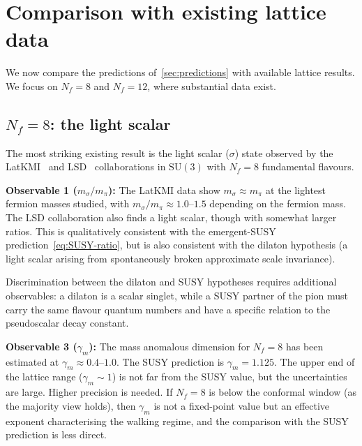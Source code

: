 \documentclass[11pt,a4paper]{article}
\theoremstyle{plain}
\theoremstyle{definition}
\theoremstyle{remark}
\newcommand{\Nf}{N_{\!f}}
\newcommand{\SU}[1]{\mathrm{SU}(#1)}
\begin{document}
\section{Comparison with existing lattice data}
\label{sec:comparison}

We now compare the predictions of~\cref{sec:predictions} with
available lattice results.  We focus on $\Nf = 8$ and $\Nf = 12$,
where substantial data exist.

\subsection{$\Nf = 8$: the light scalar}

The most striking existing result is the light scalar ($\sigma$) state
observed by the LatKMI~\cite{LatKMI2014_Nf8} and
LSD~\cite{LSD2014_Nf8,LSD2016_Nf8} collaborations in $\SU{3}$ with
$\Nf = 8$ fundamental flavours.

\textbf{Observable 1 ($m_\sigma / m_\pi$):}
The LatKMI data show $m_\sigma \approx m_\pi$ at the lightest fermion
masses studied, with $m_\sigma / m_\pi \approx 1.0$--$1.5$ depending
on the fermion mass.  The LSD collaboration also finds a light scalar,
though with somewhat larger ratios.  This is qualitatively consistent
with the emergent-SUSY prediction~\eqref{eq:SUSY-ratio}, but is also
consistent with the dilaton hypothesis (a light scalar arising from
spontaneously broken approximate scale invariance).

Discrimination between the dilaton and SUSY hypotheses requires
additional observables: a dilaton is a scalar singlet, while a SUSY
partner of the pion must carry the same flavour quantum numbers and
have a specific relation to the pseudoscalar decay constant.

\textbf{Observable 3 ($\gamma_m$):}
The mass anomalous dimension for $\Nf = 8$ has been estimated at
$\gamma_m \approx 0.4$--$1.0$.  The SUSY prediction is $\gamma_m =
1.125$.  The upper end of the lattice range ($\gamma_m \sim 1$) is
not far from the SUSY value, but the uncertainties are large.  Higher
precision is needed.  If $\Nf = 8$ is below the conformal window
(as the majority view holds), then $\gamma_m$ is not a fixed-point
value but an effective exponent characterising the walking regime, and
the comparison with the SUSY prediction is less direct.
\end{document}
